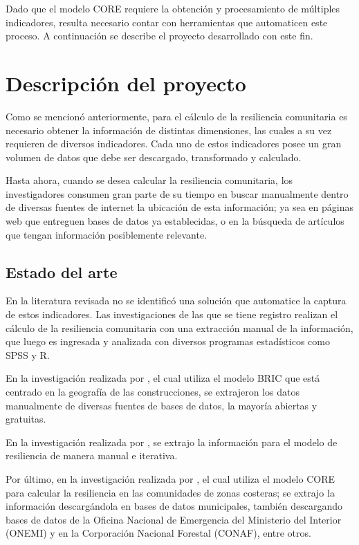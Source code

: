 \documentclass[12pt,letterpaper,oneside]{report}
\begin{document}
Dado que el modelo CORE requiere la obtenci\'on y procesamiento de m\'ultiples indicadores, resulta necesario contar con herramientas que automaticen este proceso. A continuaci\'on se describe el proyecto desarrollado con este fin.

\section{Descripci\'on del proyecto}
\label{sec:descripcion-proyecto}

Como se mencion\'o anteriormente, para el c\'alculo de la resiliencia comunitaria es necesario obtener la informaci\'on de distintas dimensiones, las cuales a su vez requieren de diversos indicadores. Cada uno de estos indicadores posee un gran volumen de datos que debe ser descargado, transformado y calculado.

Hasta ahora, cuando se desea calcular la resiliencia comunitaria, los investigadores consumen gran parte de su tiempo en buscar manualmente dentro de diversas fuentes de internet la ubicaci\'on de esta informaci\'on; ya sea en p\'aginas web que entreguen bases de datos ya establecidas, o en la b\'usqueda de art\'iculos que tengan informaci\'on posiblemente relevante.

\subsection{Estado del arte}
\label{sec:estado-arte}

En la literatura revisada no se identific\'o una soluci\'on que automatice la captura de estos indicadores. Las investigaciones de las que se tiene registro realizan el c\'alculo de la resiliencia comunitaria con una extracci\'on manual de la informaci\'on, que luego es ingresada y analizada con diversos programas estad\'isticos como SPSS y R.

En la investigaci\'on realizada por \textcite{cutter2014}, el cual utiliza el modelo BRIC que est\'a centrado en la geograf\'ia de las construcciones, se extrajeron los datos manualmente de diversas fuentes de bases de datos, la mayor\'ia abiertas y gratuitas.

En la investigaci\'on realizada por \textcite{kamara2019}, se extrajo la informaci\'on para el modelo de resiliencia de manera manual e iterativa.

Por \'ultimo, en la investigaci\'on realizada por \textcite{villagra2017}, el cual utiliza el modelo CORE para calcular la resiliencia en las comunidades de zonas costeras; se extrajo la informaci\'on descarg\'andola en bases de datos municipales, tambi\'en descargando bases de datos de la Oficina Nacional de Emergencia del Ministerio del Interior (ONEMI) y en la Corporaci\'on Nacional Forestal (CONAF), entre otros.
\end{document}
